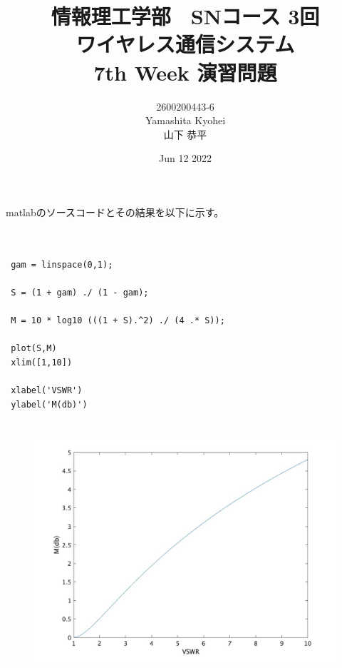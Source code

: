 \documentclass[dvipdfmx,autodetect-engine,titlepage]{jsarticle}
\title{情報理工学部　SNコース 3回\\
ワイヤレス通信システム\\
7th Week 演習問題}
\author{2600200443-6\\Yamashita Kyohei\\山下 恭平}
\date{Jun 12 2022}
\begin{document}
\maketitle

\section{}

matlabのソースコードとその結果を以下に示す。

\begin{lstlisting}[caption=hoge,label=fuga]

     
 gam = linspace(0,1);

 S = (1 + gam) ./ (1 - gam);
 
 M = 10 * log10 (((1 + S).^2) ./ (4 .* S));
 
 plot(S,M)
 xlim([1,10])

 xlabel('VSWR') 
 ylabel('M(db)') 


\end{lstlisting}

\begin{figure}[h]
  \centering
  \includegraphics[scale=0.4]{VSW.jpg}
\end{figure}
\end{document}
